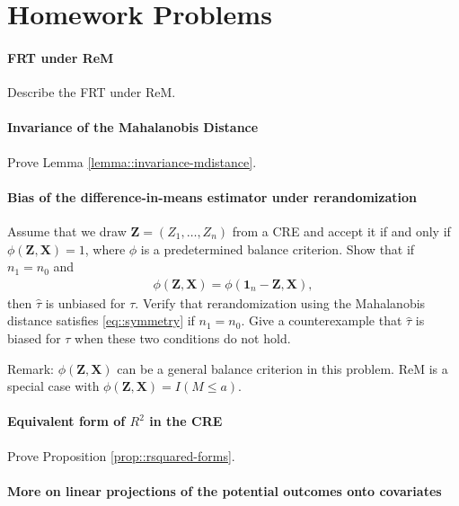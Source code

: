 \section{Homework Problems}

\paragraph{FRT under ReM}\label{hw::FRT-under-REM}

Describe the FRT under ReM.


\paragraph{Invariance of the Mahalanobis Distance}\label{para::invariance-M}

Prove Lemma \ref{lemma::invariance-mdistance}. 


\paragraph{Bias of the difference-in-means estimator under rerandomization}\label{hw::unbiasednessof-tauhat-rerandom}

Assume that we draw $\bm{Z} = (Z_1, \ldots, Z_n)$ from a CRE and accept it if and only if $\phi(\bm{Z}, \bm{X}) = 1$, where $\phi$ is a predetermined balance criterion. Show that if $n_1 = n_0$ and 
\begin{eqnarray}
\phi(\bm{Z}, \bm{X}) = \phi(\bm{1}_n-\bm{Z}, \bm{X}), \label{eq::symmetry}
\end{eqnarray}
then $\hat{\tau}$ is unbiased for $\tau$. 
Verify that rerandomization using the Mahalanobis distance satisfies \eqref{eq::symmetry} if $n_1 = n_0$. 
Give a counterexample that $\hat{\tau}$ is biased for $\tau$ when these two conditions do not hold.  


Remark: $\phi(\bm{Z}, \bm{X}) $ can be a general balance criterion in this problem. ReM is a special case with $\phi(\bm{Z}, \bm{X})  =  I(M\leq a) $.


\paragraph{Equivalent form of $R^2$ in the CRE}\label{para::r2-cre}

Prove Proposition \ref{prop::rsquared-forms}. 



\paragraph{More on linear projections of the potential outcomes onto covariates}\label{hw::projection-po-onto-x}



